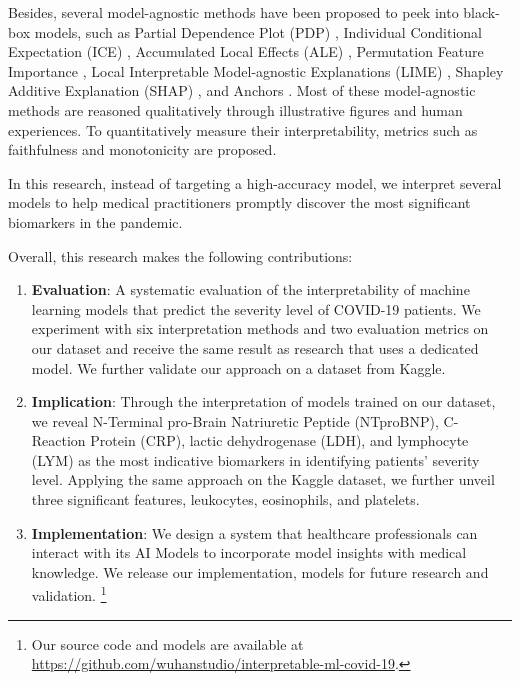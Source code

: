 Besides, several model-agnostic methods have been proposed to peek into black-box models, such as Partial Dependence Plot (PDP) \citep{Friedman2001GreedyFA}, Individual Conditional Expectation (ICE) \citep{goldstein2013peeking}, Accumulated Local Effects (ALE) \citep{apley2016visualizing}, Permutation Feature Importance \citep{fisher2018models}, Local Interpretable Model-agnostic Explanations (LIME) \citep{ribeiro2016i}, Shapley Additive Explanation (SHAP) \citep{lundberg2017unified}, and Anchors \citep{Ribeiro2018AnchorsHM}. Most of these model-agnostic methods are reasoned qualitatively through illustrative figures and human experiences. To quantitatively measure their interpretability, metrics such as faithfulness \citep{alvarezmelis2018robust} and monotonicity \citep{luss2019generating} are proposed.

In this research, instead of targeting a high-accuracy model, we interpret several models to help medical practitioners promptly discover the most significant biomarkers in the pandemic.

Overall, this research makes the following contributions:

\begin{enumerate}
    \item \textbf{Evaluation}: A systematic evaluation of the interpretability of machine learning models that predict the severity level of COVID-19 patients. We experiment with six interpretation methods and two evaluation metrics on our dataset and receive the same result as research that uses a dedicated model. We further validate our approach on a dataset from Kaggle.

    \item \textbf{Implication}: Through the interpretation of models trained on our dataset, we reveal N-Terminal pro-Brain Natriuretic Peptide (NTproBNP), C-Reaction Protein (CRP), lactic dehydrogenase (LDH), and lymphocyte (LYM) as the most indicative biomarkers in identifying patients' severity level. Applying the same approach on the Kaggle dataset, we further unveil three significant features, leukocytes, eosinophils, and platelets.

    \item \textbf{Implementation}: We design a system that healthcare professionals can interact with its AI Models to incorporate model insights with medical knowledge. We release our implementation, models for future research and validation. \footnote{Our source code and models are available at \url{https://github.com/wuhanstudio/interpretable-ml-covid-19}.}
\end{enumerate}

